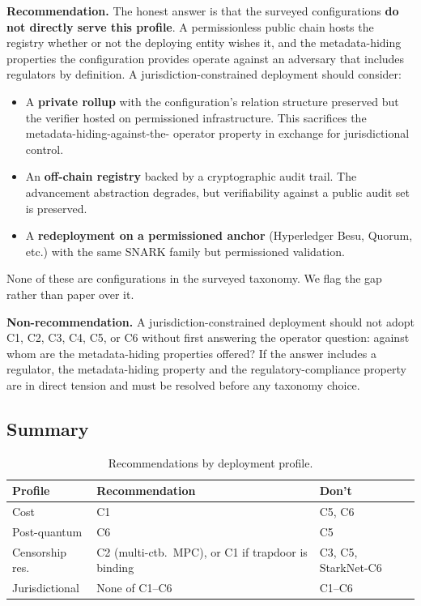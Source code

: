 \textbf{Recommendation.} The honest answer is that the surveyed
configurations \textbf{do not directly serve this profile}. A
permissionless public chain hosts the registry whether or not the
deploying entity wishes it, and the metadata-hiding properties the
configuration provides operate against an adversary that includes
regulators by definition. A jurisdiction-constrained deployment
should consider:
\begin{itemize}
  \item A \textbf{private rollup} with the configuration's relation
    structure preserved but the verifier hosted on permissioned
    infrastructure. This sacrifices the metadata-hiding-against-the-
    operator property in exchange for jurisdictional control.
  \item An \textbf{off-chain registry} backed by a cryptographic
    audit trail. The advancement abstraction degrades, but
    verifiability against a public audit set is preserved.
  \item A \textbf{redeployment on a permissioned anchor} (Hyperledger
    Besu, Quorum, etc.) with the same SNARK family but
    permissioned validation.
\end{itemize}
None of these are configurations in the surveyed taxonomy. We flag
the gap rather than paper over it.

\textbf{Non-recommendation.} A jurisdiction-constrained deployment
should not adopt C1, C2, C3, C4, C5, or C6 without first answering
the operator question: against whom are the metadata-hiding
properties offered? If the answer includes a regulator, the
metadata-hiding property and the regulatory-compliance property are
in direct tension and must be resolved before any taxonomy choice.

\subsection{Summary}
\label{sec:rec-summary}

\begin{table}[t]
  \centering
  \caption{Recommendations by deployment profile.}
  \label{tab:recommendations}
  \begin{tabularx}{\columnwidth}{@{}lXl@{}}
    \toprule
    Profile & Recommendation & Don't \\
    \midrule
    Cost              & C1 & C5, C6 \\
    Post-quantum      & C6 & C5 \\
    Censorship res.   & C2 (multi-ctb.\ MPC), or C1 if trapdoor is binding & C3, C5, StarkNet-C6 \\
    Jurisdictional    & None of C1--C6 & C1--C6 \\
    \bottomrule
  \end{tabularx}
\end{table}

